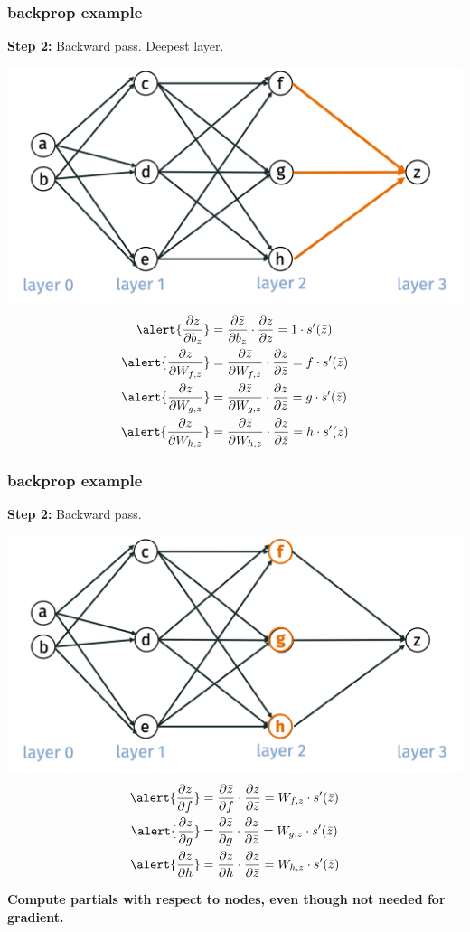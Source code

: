 \documentclass[handout,compress]{beamer}
\begin{document}
	\begin{frame}[t]
		\frametitle{backprop example}
		\small
		\textbf{Step 2:} Backward pass. Deepest layer.
		
		\includegraphics[width=.5\textwidth]{layer1.png}
		\begin{align*}
		\alert{\frac{\partial z}{\partial b_{z}}} &= \frac{\partial \bar{z}}{\partial b_{z}}\cdot \frac{\partial z}{\partial \bar{z}} = 1\cdot s'(\bar{z})\\
		\alert{\frac{\partial z}{\partial W_{f,z}}} &= \frac{\partial \bar{z}}{\partial W_{f,z}}\cdot \frac{\partial z}{\partial \bar{z}} = f\cdot s'(\bar{z}) \\
		\alert{\frac{\partial z}{\partial W_{g,z}}} &= \frac{\partial \bar{z}}{\partial W_{g,z}}\cdot \frac{\partial z}{\partial \bar{z}} = g\cdot s'(\bar{z}) \\
		\alert{\frac{\partial z}{\partial W_{h,z}}} &= \frac{\partial \bar{z}}{\partial W_{h,z}}\cdot \frac{\partial z}{\partial \bar{z}} = h\cdot s'(\bar{z})
		\end{align*}
	\end{frame}

	\begin{frame}[t]
	\frametitle{backprop example}
	\small
	\textbf{Step 2:} Backward pass.
	
	\includegraphics[width=.5\textwidth]{nodes1.png}
	\begin{align*}
	\alert{\frac{\partial z}{\partial f}} &= \frac{\partial \bar{z}}{\partial f}\cdot \frac{\partial z}{\partial \bar{z}} = W_{f,z}\cdot s'(\bar{z}) \\
		\alert{\frac{\partial z}{\partial g}} &= \frac{\partial \bar{z}}{\partial g}\cdot \frac{\partial z}{\partial \bar{z}} = W_{g,z}\cdot s'(\bar{z}) \\
			\alert{\frac{\partial z}{\partial h}} &= \frac{\partial \bar{z}}{\partial h}\cdot \frac{\partial z}{\partial \bar{z}} = W_{h,z}\cdot s'(\bar{z}) \\
	\end{align*}
	\vspace{-3em}
	
	\begin{center}
		\textbf{\alert{Compute partials with respect to nodes, even though not needed for gradient.}}
	\end{center}
	\end{frame}
\end{document}
